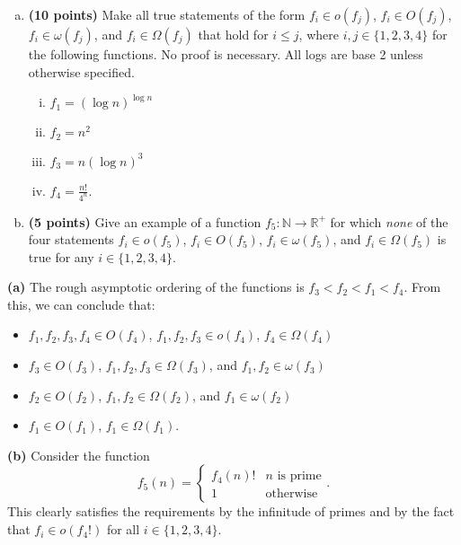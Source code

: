 \documentclass[11pt, letterpaper]{article}
\begin{document}
\pagebreak
\begin{problem}\noindent
    \begin{enumerate}[(a)]
        \item {\bf (10 points)} Make all true statements of the form $f_i \in o(f_j)$, $f_i \in O(f_j)$, $f_i \in \omega(f_j)$, and $f_i \in \Omega(f_j)$ that hold for $i \le j$, where $i, j \in \{1,2,3,4\}$ for the following functions. No proof is necessary. All logs are base 2 unless otherwise specified.
        \begin{enumerate}[(i)]
            \item $f_1 = (\log n)^{\log n}$
            \item $f_2 = n^2$
            \item $f_3 = n (\log n)^3$
            \item $f_4 = \frac{n!}{4^n}$.
        \end{enumerate}
        \item {\bf (5 points)} Give an example of a function $f_5: \mathbb{N} \to \mathbb{R}^+$ for which \emph{none} of the four statements $f_i \in o(f_5)$, $f_i \in O(f_5)$, $f_i \in \omega(f_5)$, and $f_i \in \Omega(f_5)$ is true for any $i \in \{1,2,3,4\}$.
    \end{enumerate}
\end{problem}

\begin{solution}
    \textbf{(a)} The rough asymptotic ordering of the functions is $f_3 < f_2 < f_1 < f_4$. From this, we can conclude that:
    
    \begin{itemize}
        \item $f_1,f_2,f_3,f_4\in O(f_4)$, $f_1,f_2,f_3\in o(f_4)$, $f_4\in \Omega(f_4)$
        \item $f_3 \in O(f_3)$, $f_1,f_2,f_3\in \Omega(f_3)$, and $f_1,f_2\in \omega(f_3)$
        \item $f_2\in O(f_2)$, $f_1,f_2\in \Omega(f_2)$, and $f_1\in \omega(f_2)$
        \item $f_1\in O(f_1)$, $f_1\in \Omega(f_1)$.   
    \end{itemize}

    \textbf{(b)} Consider the function
    \[
        f_5(n)=\begin{cases}
            f_4(n)!&n \textrm{ is prime}\\
            1&\textrm{otherwise}
        \end{cases}
    .\] 
    This clearly satisfies the requirements by the infinitude of primes and by the fact that $f_i\in o(f_4!)$ for all $i\in\{1,2,3,4\}$. 
\end{solution}
\end{document}
